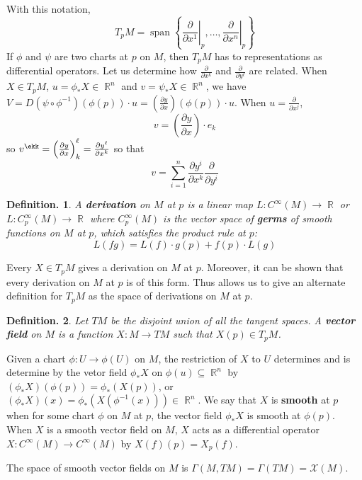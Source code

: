 \documentclass[11pt, a4paper]{memoir}
\DeclareMathOperator{\R}{{\mathbb{R}}}
\theoremstyle{change}
\theoremstyle{plain}
\theoremstyle{nonumberplain}
\newtheorem{definition}{Definition.}
\DeclareMathOperator{\spn}{span}
\newcommand{\prt}[2]{\ensuremath{\frac{\partial #1}{\partial #2}}}
\numberwithin{equation}{section}
\begin{document}
With this notation,
\begin{equation*}
    T_pM=\spn\left\{\left.\prt{}{x^1}\right\rvert_p,\ldots,\left.\prt{}{x^n}\right\rvert_p\right\}
\end{equation*}
If $\phi$ and $\psi$ are two charts at $p$ on $M$, then $T_pM$ has to representations as differential operators.
Let us determine how $\prt{}{x^k}$ and $\prt{}{y^\ell}$ are related.
When $X\in T_pM$, $u=\phi_*X\in\R^n$ and $v=\psi_*X\in\R^n$, we have $V=D(\psi\circ\phi^{-1})(\phi(p))\cdot u=\left(\prt{y}{x}\right)(\phi(p))\cdot u$.
When $u=\prt{}{x^j}$,
\begin{equation*}
    v=\left(\prt{y}{x}\right)\cdot e_k
\end{equation*}
so $v^\ekk=\left(\prt{y}{x}\right)_k^\ell=\prt{y^\ell}{x^k}$ so that
\begin{equation*}
    v=\sum_{i=1}^n\prt{y^i}{x^k}\prt{}{y^i}
\end{equation*}
\begin{definition}
    A \textbf{derivation} on $M$ at $p$ is a linear map $L:C^\infty(M)\to\R$ or $L:C_p^\infty(M)\to\R$ where $C_p^\infty(M)$ is the vector space of \textbf{germs} of smooth functions on $M$ at $p$, which satisfies the product rule at $p$:
    \begin{equation*}
        L(fg)=L(f)\cdot g(p)+f(p)\cdot L(g)
    \end{equation*}
\end{definition}
Every $X\in T_pM$ gives a derivation on $M$ at $p$.
Moreover, it can be shown that every derivation on $M$ at $p$ is of this form.
Thus allows us to give an alternate definition for $T_pM$ as the space of derivations on $M$ at $p$.

\begin{definition}
    Let $TM$ be the disjoint union of all the tangent spaces.
    A \textbf{vector field} on $M$ is a function $X:M\to TM$ such that $X(p)\in T_pM$.
\end{definition}
Given a chart $\phi:U\to\phi(U)$ on $M$, the restriction of $X$ to $U$ determines and is determine by the vetor field $\phi_*X$ on $\phi(u)\subseteq\R^n$ by $(\phi_*X)(\phi(p))=\phi_*(X(p))$, or $(\phi_*X)(x)=\phi_*(X(\phi^{-1}(x)))\in\R^n$.
We say that $X$ is \textbf{smooth} at $p$ when for some chart $\phi$ on $M$ at $p$, the vector field $\phi_*X$ is smooth at $\phi(p)$.
When $X$ is a smooth vector field on $M$, $X$ acts as a differential operator $X:C^\infty(M)\to C^\infty(M)$ by $X(f)(p)=X_p(f)$.

The space of smooth vector fields on $M$ is $\Gamma(M,TM)=\Gamma(TM)=\mathcal{X}(M)$.
\end{document}
